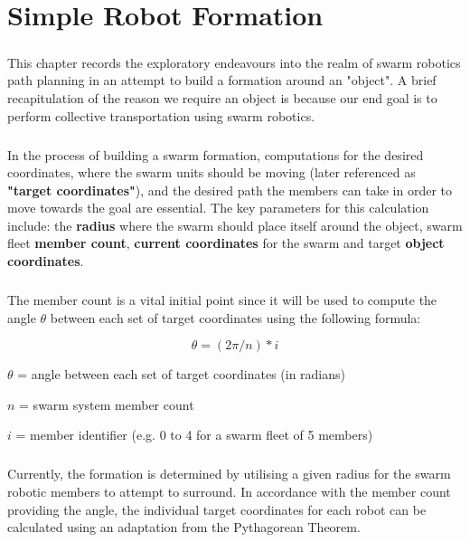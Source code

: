 \chapter{Simple Robot Formation}

\paragraph*{}
This chapter records the exploratory endeavours into the realm of swarm robotics path planning in an attempt to build a formation around an "object". A brief recapitulation of the reason we require an object is because our end goal is to perform collective transportation using swarm robotics.

\paragraph*{}
In the process of building a swarm formation, computations for the desired coordinates, where the swarm units should be moving (later referenced as \textbf{"target coordinates"}), and the desired path the members can take in order to move towards the goal are essential. The key parameters for this calculation include: the \textbf{radius} where the swarm should place itself around the object, swarm fleet \textbf{member count}, \textbf{current coordinates} for the swarm and target \textbf{object coordinates}.

\paragraph*{}
The member count is a vital initial point since it will be used to compute the angle \(\theta\) between each set of target coordinates using the following formula:

\[\theta = (2\pi / n) * i\]

\begin{description}
    \item[where:]
    \item \(\theta\) = angle between each set of target coordinates (in radians)
    \item \(n\) = swarm system member count
    \item \(i\) = member identifier (e.g. 0 to 4 for a swarm fleet of 5 members)
\end{description}

\paragraph*{}
Currently, the formation is determined by utilising a given radius for the swarm robotic members to attempt to surround. In accordance with the member count providing the angle, the individual target coordinates for each robot can be calculated using an adaptation from the Pythagorean Theorem. 


